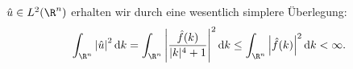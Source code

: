 \begin{solution}
\begin{itemize}
    $\hat u \in L^2(\R^n)$ erhalten wir durch eine wesentlich simplere Überlegung:
    \begin{align*}
        \int_{\R^n} \left| \hat u \right|^2 \mathrm{d}k = \int_{\R^n} \left| \frac{\hat f(k)}{|k|^4 + 1} \right|^2 \mathrm{d}k \leq \int_{\R^n} \left| \hat f(k) \right|^2 \mathrm{d}k < \infty.
    \end{align*}
\end{itemize}

\end{solution}

